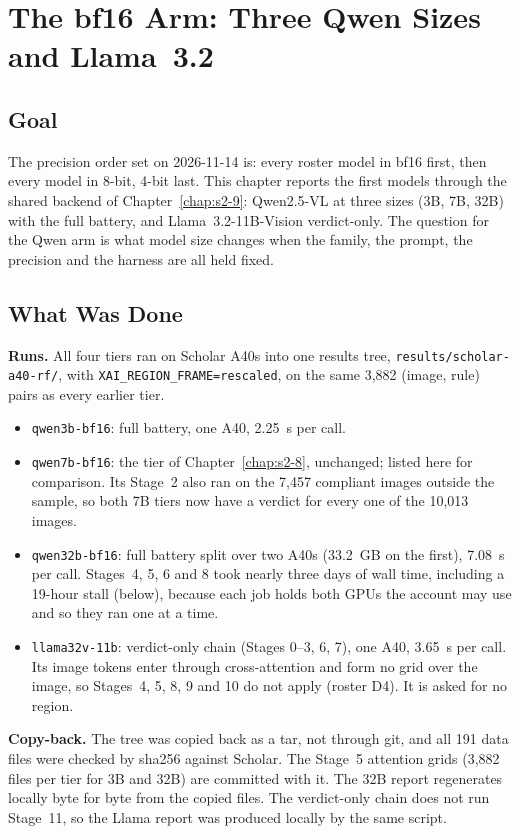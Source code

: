 \chapter{The bf16 Arm: Three Qwen Sizes and Llama~3.2}
\label{chap:s2-10}

\section{Goal}

The precision order set on 2026-11-14 is: every roster model in bf16 first, then every model in 8-bit,
4-bit last. This chapter reports the first models through the shared backend of
Chapter~\ref{chap:s2-9}: Qwen2.5-VL at three sizes (3B, 7B, 32B) with the full battery, and
Llama~3.2-11B-Vision verdict-only. The question for the Qwen arm is what model size changes when the
family, the prompt, the precision and the harness are all held fixed.

\section{What Was Done}

\textbf{Runs.} All four tiers ran on Scholar A40s into one results tree,
\texttt{results/scholar-a40-rf/}, with \texttt{XAI\_REGION\_FRAME=rescaled}, on the same 3,882
(image, rule) pairs as every earlier tier.
\begin{itemize}
\item \texttt{qwen3b-bf16}: full battery, one A40, 2.25~s per call.
\item \texttt{qwen7b-bf16}: the tier of Chapter~\ref{chap:s2-8}, unchanged; listed here for comparison.
Its Stage~2 also ran on the 7,457 compliant images outside the sample, so both 7B tiers now have a
verdict for every one of the 10,013 images.
\item \texttt{qwen32b-bf16}: full battery split over two A40s (33.2~GB on the first), 7.08~s per call.
Stages~4, 5, 6 and 8 took nearly three days of wall time, including a 19-hour stall (below), because
each job holds both GPUs the account may use and so they ran one at a time.
\item \texttt{llama32v-11b}: verdict-only chain (Stages 0--3, 6, 7), one A40, 3.65~s per call.
Its image tokens enter through cross-attention and form no grid over the image, so Stages~4, 5, 8, 9
and 10 do not apply (roster D4). It is asked for no region.
\end{itemize}

\textbf{Copy-back.} The tree was copied back as a tar, not through git, and all 191 data files were
checked by sha256 against Scholar. The Stage~5 attention grids (3,882 files per tier for 3B and 32B) are
committed with it. The 32B report regenerates locally byte for byte from the copied files. The verdict-only
chain does not run Stage~11, so the Llama report was produced locally by the same script.

